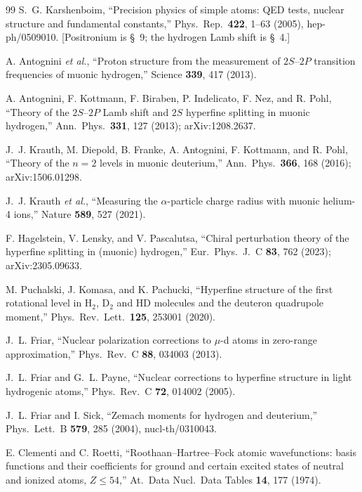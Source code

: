 \documentclass[11pt]{article}
\begin{document}
\begin{thebibliography}{99}
S.~G. Karshenboim,
``Precision physics of simple atoms: QED tests, nuclear structure and
fundamental constants,''
Phys.\ Rep.\ \textbf{422}, 1--63 (2005), hep-ph/0509010.
[Positronium is \S~9; the hydrogen Lamb shift is \S~4.]

A. Antognini \emph{et al.},
``Proton structure from the measurement of $2S$--$2P$ transition
frequencies of muonic hydrogen,''
Science \textbf{339}, 417 (2013).

A. Antognini, F. Kottmann, F. Biraben, P. Indelicato, F. Nez, and R. Pohl,
``Theory of the $2S$--$2P$ Lamb shift and $2S$ hyperfine splitting in
muonic hydrogen,''
Ann.\ Phys.\ \textbf{331}, 127 (2013); arXiv:1208.2637.

J.~J. Krauth, M. Diepold, B. Franke, A. Antognini, F. Kottmann, and R. Pohl,
``Theory of the $n=2$ levels in muonic deuterium,''
Ann.\ Phys.\ \textbf{366}, 168 (2016); arXiv:1506.01298.

J.~J. Krauth \emph{et al.},
``Measuring the $\alpha$-particle charge radius with muonic helium-4 ions,''
Nature \textbf{589}, 527 (2021).

F. Hagelstein, V. Lensky, and V. Pascalutsa,
``Chiral perturbation theory of the hyperfine splitting in (muonic)
hydrogen,''
Eur.\ Phys.\ J.\ C \textbf{83}, 762 (2023); arXiv:2305.09633.

M. Puchalski, J. Komasa, and K. Pachucki,
``Hyperfine structure of the first rotational level in H$_2$, D$_2$ and HD
molecules and the deuteron quadrupole moment,''
Phys.\ Rev.\ Lett.\ \textbf{125}, 253001 (2020).

J.~L. Friar,
``Nuclear polarization corrections to $\mu$-d atoms in zero-range
approximation,''
Phys.\ Rev.\ C \textbf{88}, 034003 (2013).

J.~L. Friar and G.~L. Payne,
``Nuclear corrections to hyperfine structure in light hydrogenic atoms,''
Phys.\ Rev.\ C \textbf{72}, 014002 (2005).

J.~L. Friar and I. Sick,
``Zemach moments for hydrogen and deuterium,''
Phys.\ Lett.\ B \textbf{579}, 285 (2004), nucl-th/0310043.

E. Clementi and C. Roetti,
``Roothaan--Hartree--Fock atomic wavefunctions: basis functions and their
coefficients for ground and certain excited states of neutral and ionized
atoms, $Z \leq 54$,''
At.\ Data Nucl.\ Data Tables \textbf{14}, 177 (1974).


\end{thebibliography}
\end{document}
